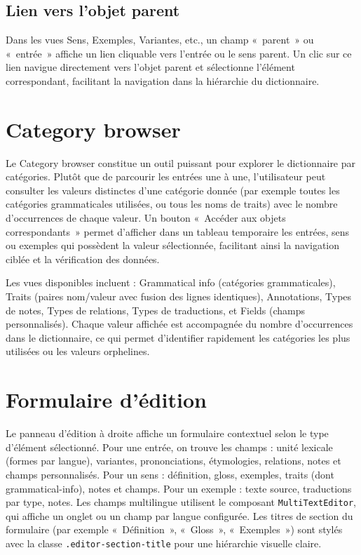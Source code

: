 \documentclass[11pt,twoside,openany]{book}
\begin{document}
\subsection{Lien vers l'objet parent}

Dans les vues Sens, Exemples, Variantes, etc., un champ «~parent~» ou «~entrée~» affiche un lien cliquable vers l'entrée ou le sens parent. Un clic sur ce lien navigue directement vers l'objet parent et sélectionne l'élément correspondant, facilitant la navigation dans la hiérarchie du dictionnaire.

\section{Category browser}

Le Category browser constitue un outil puissant pour explorer le dictionnaire par catégories. Plutôt que de parcourir les entrées une à une, l'utilisateur peut consulter les valeurs distinctes d'une catégorie donnée (par exemple toutes les catégories grammaticales utilisées, ou tous les noms de traits) avec le nombre d'occurrences de chaque valeur. Un bouton «~Accéder aux objets correspondants~» permet d'afficher dans un tableau temporaire les entrées, sens ou exemples qui possèdent la valeur sélectionnée, facilitant ainsi la navigation ciblée et la vérification des données.

Les vues disponibles incluent : Grammatical info (catégories grammaticales), Traits (paires nom/valeur avec fusion des lignes identiques), Annotations, Types de notes, Types de relations, Types de traductions, et Fields (champs personnalisés). Chaque valeur affichée est accompagnée du nombre d'occurrences dans le dictionnaire, ce qui permet d'identifier rapidement les catégories les plus utilisées ou les valeurs orphelines.

\section{Formulaire d'édition}

Le panneau d'édition à droite affiche un formulaire contextuel selon le type d'élément sélectionné. Pour une entrée, on trouve les champs : unité lexicale (formes par langue), variantes, prononciations, étymologies, relations, notes et champs personnalisés. Pour un sens : définition, gloss, exemples, traits (dont grammatical-info), notes et champs. Pour un exemple : texte source, traductions par type, notes. Les champs multilingue utilisent le composant \texttt{MultiTextEditor}, qui affiche un onglet ou un champ par langue configurée. Les titres de section du formulaire (par exemple «~Définition~», «~Gloss~», «~Exemples~») sont stylés avec la classe \texttt{.editor-section-title} pour une hiérarchie visuelle claire.
\end{document}
